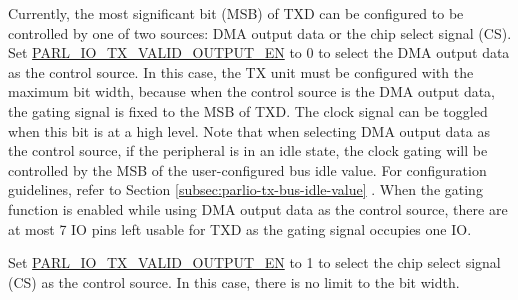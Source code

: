 \documentclass[main\_\_EN.tex]{subfiles}
\begin{document}
{Currently, the most significant bit (MSB) of TXD can be configured to be controlled by one of two sources: DMA output data or the chip select signal (CS). Set \hyperref[fielddesc:PARLIOTXVALIDOUTPUTEN]{PARL\_IO\_TX\_VALID\_OUTPUT\_EN} to 0 to select the DMA output data as the control source. In this case, the TX unit must be configured with the maximum bit width, because when the control source is the DMA output data, the gating signal is fixed to the MSB of TXD. The clock signal can be toggled when this bit is at a high level. Note that when selecting DMA output data as the control source, if the peripheral is in an idle state, the clock gating will be controlled by the MSB of the user-configured bus idle value. For configuration guidelines, refer to Section \ref{subsec:parlio-tx-bus-idle-value} . When the gating function is enabled while using DMA output data as the control source, there are at most 7 IO pins left usable for TXD as the gating signal occupies one IO.

Set \hyperref[fielddesc:PARLIOTXVALIDOUTPUTEN]{PARL\_IO\_TX\_VALID\_OUTPUT\_EN} to 1 to select the chip select signal (CS) as the control source. In this case, there is no limit to the bit width.
}
\end{document}
